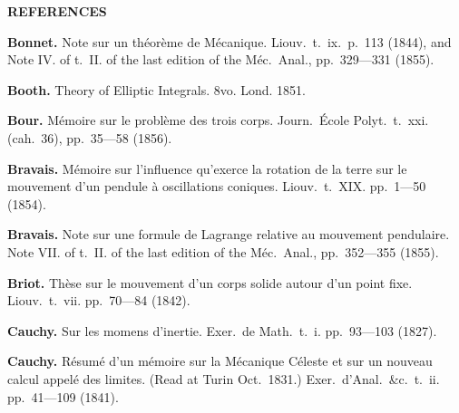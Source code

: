 \documentclass[12pt,a4paper]{article}
\theoremstyle{definition}
\begin{document}
\newpage


\begin{center}
\Large\bfseries REFERENCES
\end{center}

\noindent\textbf{Bonnet.} Note sur un th\'{e}or\`{e}me de M\'{e}canique. Liouv.~t.~ix.~p.~113 (1844), and Note IV. of t.~II. of the last edition of the M\'{e}c.~Anal., pp.~329---331 (1855).

\vspace{0.5em}

\noindent\textbf{Booth.} Theory of Elliptic Integrals. 8vo. Lond. 1851.

\vspace{0.5em}

\noindent\textbf{Bour.} M\'{e}moire sur le probl\`{e}me des trois corps. Journ.~\'{E}cole Polyt.~t.~xxi. (cah.~36), pp.~35---58 (1856).

\vspace{0.5em}

\noindent\textbf{Bravais.} M\'{e}moire sur l'influence qu'exerce la rotation de la terre sur le mouvement d'un pendule \`{a} oscillations coniques. Liouv.~t.~XIX. pp.~1---50 (1854).

\vspace{0.5em}

\noindent\textbf{Bravais.} Note sur une formule de Lagrange relative au mouvement pendulaire. Note VII. of t.~II. of the last edition of the M\'{e}c.~Anal., pp.~352---355 (1855).

\vspace{0.5em}

\noindent\textbf{Briot.} Th\`{e}se sur le mouvement d'un corps solide autour d'un point fixe. Liouv.~t.~vii. pp.~70---84 (1842).

\vspace{0.5em}

\noindent\textbf{Cauchy.} Sur les momens d'inertie. Exer.~de Math.~t.~i. pp.~93---103 (1827).

\vspace{0.5em}

\noindent\textbf{Cauchy.} R\'{e}sum\'{e} d'un m\'{e}moire sur la M\'{e}canique C\'{e}leste et sur un nouveau calcul appel\'{e} des limites. (Read at Turin Oct.~1831.) Exer.~d'Anal.~\&c.~t.~ii. pp.~41---109 (1841).
\end{document}
